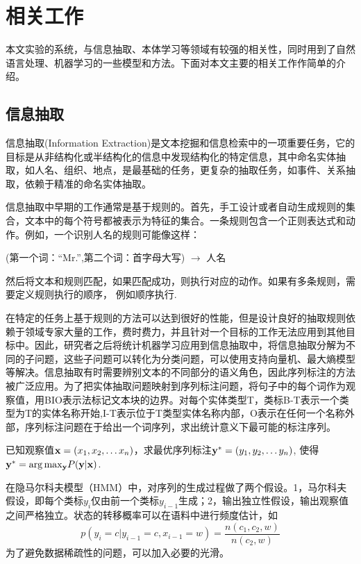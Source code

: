 \chapter{相关工作}
本文实验的系统，与信息抽取、本体学习等领域有较强的相关性，同时用到了自然语言处理、机器学习的一些模型和方法。下面对本文主要的相关工作作简单的介绍。
\section{信息抽取}

信息抽取(Information Extraction)是文本挖掘和信息检索中的一项重要任务，它的目标是从非结构化或半结构化的信息中发现结构化的特定信息，其中命名实体抽取，如人名、组织、地点，是最基础的任务，更复杂的抽取任务，如事件、关系抽取，依赖于精准的命名实体抽取。

信息抽取中早期的工作通常是基于规则的\cite{ciravegna2001adaptive}。首先，手工设计或者自动生成规则的集合，文本中的每个符号都被表示为特征的集合。一条规则包含一个正则表达式和动作。例如，一个识别人名的规则可能像这样：
\begin{center}
	(第一个词：``Mr.'',第二个词：首字母大写) $\rightarrow$ 人名
\end{center}
然后将文本和规则匹配，如果匹配成功，则执行对应的动作。如果有多条规则，需要定义规则执行的顺序，
例如顺序执行.

在特定的任务上基于规则的方法可以达到很好的性能，但是设计良好的抽取规则依赖于领域专家大量的工作，费时费力，并且针对一个目标的工作无法应用到其他目标中。因此，研究者之后将统计机器学习应用到信息抽取中，将信息抽取分解为不同的子问题，这些子问题可以转化为分类问题，可以使用支持向量机、最大熵模型等解决。信息抽取有时需要辨别文本的不同部分的语义角色，因此序列标注的方法被广泛应用。为了把实体抽取问题映射到序列标注问题，将句子中的每个词作为观察值，用BIO表示法标记文本块的边界。对每个实体类型T，类标B-T表示一个类型为T的实体名称开始,I-T表示位于T类型实体名称内部，O表示在任何一个名称外部，序列标注问题在于给出一个词序列，求出统计意义下最可能的标注序列。

\begin{problem}[序列标注]
已知观察值${\bf{x}} = ({x_1},{x_2}, \ldots {x_n})$，求最优序列标注${\bf{y^*}} = ({y_1},{y_2}, \ldots {y_n})$, 使得${{\bf{y}}^*} = \arg {\max _{\bf{y}}}P({\bf{y}}|{\bf{x}})$.
\end{problem}
在隐马尔科夫模型（HMM）中，对序列的生成过程做了两个假设。1，马尔科夫假设，即每个类标$y_i$仅由前一个类标$y_{i-1}$生成；2，输出独立性假设，输出观察值之间严格独立。状态的转移概率可以在语料中进行频度估计，如
\[
p(y_i=c|y_{i-1} = c, x_{i-1}=w) = \frac{n(c_1, c_2, w)}{n(c_2, w)}
\]
为了避免数据稀疏性的问题，可以加入必要的光滑。

